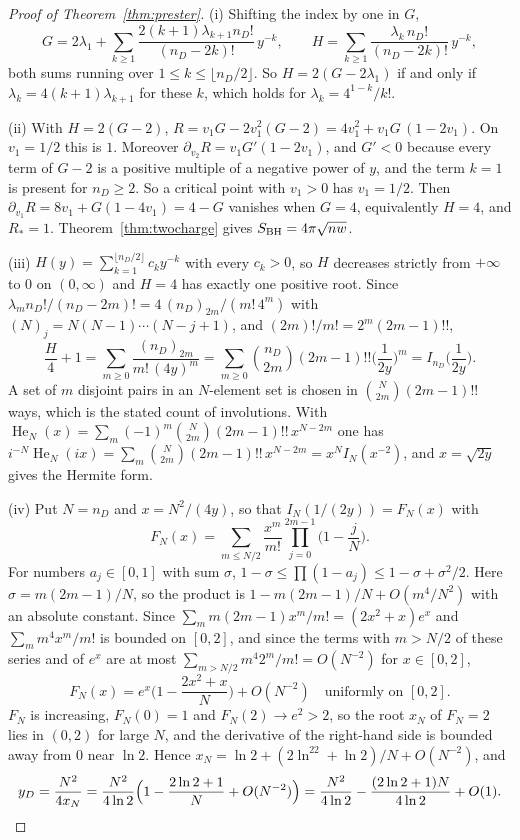 \begin{proof}[Proof of Theorem~\ref{thm:prester}]
(i) Shifting the index by one in $G$,
\[
G=2\lambda_1+\sum_{k\ge1}\frac{2(k+1)\lambda_{k+1}n_D!}{(n_D-2k)!}\,y^{-k},\qquad H=\sum_{k\ge1}\frac{\lambda_k\,n_D!}{(n_D-2k)!}\,y^{-k},
\]
both sums running over $1\le k\le\lfloor n_D/2\rfloor$. So $H=2(G-2\lambda_1)$ if and only if $\lambda_k=4(k+1)\lambda_{k+1}$ for these $k$, which holds for $\lambda_k=4^{1-k}/k!$.

(ii) With $H=2(G-2)$, $R=v_1G-2v_1^2(G-2)=4v_1^2+v_1G\,(1-2v_1)$. On $v_1=1/2$ this is $1$. Moreover $\partial_{v_2}R=v_1G'(1-2v_1)$, and $G'<0$ because every term of $G-2$ is a positive multiple of a negative power of $y$, and the term $k=1$ is present for $n_D\ge2$. So a critical point with $v_1>0$ has $v_1=1/2$. Then $\partial_{v_1}R=8v_1+G(1-4v_1)=4-G$ vanishes when $G=4$, equivalently $H=4$, and $R_*=1$. Theorem~\ref{thm:twocharge} gives $S_{\rm BH}=4\pi\sqrt{nw}$.

(iii) $H(y)=\sum_{k=1}^{\lfloor n_D/2\rfloor}c_ky^{-k}$ with every $c_k>0$, so $H$ decreases strictly from $+\infty$ to $0$ on $(0,\infty)$ and $H=4$ has exactly one positive root. Since $\lambda_mn_D!/(n_D-2m)!=4\,(n_D)_{2m}/(m!\,4^m)$ with $(N)_{j}=N(N-1)\cdots(N-j+1)$, and $(2m)!/m!=2^m(2m-1)!!$,
\[
\frac H4+1=\sum_{m\ge0}\frac{(n_D)_{2m}}{m!\,(4y)^m}=\sum_{m\ge0}\binom{n_D}{2m}(2m-1)!!\Big(\frac1{2y}\Big)^m=I_{n_D}\Big(\frac1{2y}\Big).
\]
A set of $m$ disjoint pairs in an $N$-element set is chosen in $\binom N{2m}(2m-1)!!$ ways, which is the stated count of involutions. With $\operatorname{He}_N(x)=\sum_m(-1)^m\binom N{2m}(2m-1)!!\,x^{N-2m}$ one has $i^{-N}\operatorname{He}_N(ix)=\sum_m\binom N{2m}(2m-1)!!\,x^{N-2m}=x^NI_N(x^{-2})$, and $x=\sqrt{2y}$ gives the Hermite form.

(iv) Put $N=n_D$ and $x=N^2/(4y)$, so that $I_N(1/(2y))=F_N(x)$ with
\[
F_N(x)=\sum_{m\le N/2}\frac{x^m}{m!}\prod_{j=0}^{2m-1}\Big(1-\frac jN\Big).
\]
For numbers $a_j\in[0,1]$ with sum $\sigma$, $1-\sigma\le\prod(1-a_j)\le1-\sigma+\sigma^2/2$. Here $\sigma=m(2m-1)/N$, so the product is $1-m(2m-1)/N+O(m^4/N^2)$ with an absolute constant. Since $\sum_m m(2m-1)x^m/m!=(2x^2+x)e^x$ and $\sum_m m^4x^m/m!$ is bounded on $[0,2]$, and since the terms with $m>N/2$ of these series and of $e^x$ are at most $\sum_{m>N/2}m^4 2^m/m!=O(N^{-2})$ for $x\in[0,2]$,
\[
F_N(x)=e^x\Big(1-\frac{2x^2+x}{N}\Big)+O(N^{-2})\quad\text{uniformly on }[0,2].
\]
$F_N$ is increasing, $F_N(0)=1$ and $F_N(2)\to e^2>2$, so the root $x_N$ of $F_N=2$ lies in $(0,2)$ for large $N$, and the derivative of the right-hand side is bounded away from $0$ near $\ln2$. Hence $x_N=\ln2+(2\ln^22+\ln2)/N+O(N^{-2})$, and
\[
y_D=\frac{N^2}{4x_N}=\frac{N^2}{4\ln2}\Big(1-\frac{2\ln2+1}{N}+O(N^{-2})\Big)=\frac{N^2}{4\ln2}-\frac{(2\ln2+1)N}{4\ln2}+O(1).\qedhere
\]
\end{proof}

